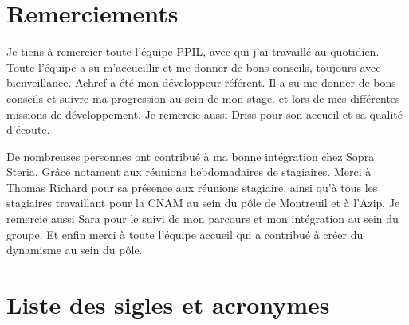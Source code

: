 \documentclass[a4paper,12pt]{book}
\theoremstyle{break}
\begin{document}

\frontmatter

\chapter*{Remerciements}
Je tiens à remercier toute l'équipe PPIL, avec qui j'ai travaillé au quotidien. Toute l'équipe a su m'accueillir et me donner de bons conseils, toujours avec bienveillance. 
Achref a été mon développeur référent. Il a su me donner de bons conseils et suivre ma progression au sein de mon stage. et lors de mes différentes missions de développement.
Je remercie aussi Driss pour son accueil et sa qualité d'écoute.

De nombreuses personnes ont contribué à ma bonne intégration chez Sopra Steria. Grâce notament aux réunions hebdomadaires de stagiaires. Merci à Thomas Richard pour sa présence aux réunions stagiaire, ainsi qu’à tous les stagiaires travaillant pour la CNAM au sein du pôle de Montreuil et à l'Azip.
Je remercie aussi Sara pour le suivi de mon parcours et mon intégration au sein du groupe.
Et enfin merci à toute l'équipe accueil qui a contribué à créer du dynamisme au sein du pôle.

%
\clearpage
\tableofcontents

\clearpage
\listoffigures

\clearpage
\chapter*{Liste des sigles et acronymes}
\begin{acronym}[CP-OFDMX] %
\end{acronym}
\end{document}
